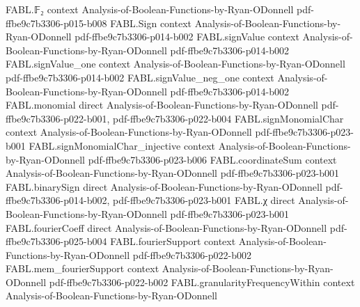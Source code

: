 \begin{theorem}
\leanok
{}
\proofstep
  {FABL.𝔽₂}
  {context}
  {Analysis-of-Boolean-Functions-by-Ryan-ODonnell}
  {pdf-ffbe9c7b3306-p015-b008}
\proofstep
  {FABL.Sign}
  {context}
  {Analysis-of-Boolean-Functions-by-Ryan-ODonnell}
  {pdf-ffbe9c7b3306-p014-b002}
\proofstep
  {FABL.signValue}
  {context}
  {Analysis-of-Boolean-Functions-by-Ryan-ODonnell}
  {pdf-ffbe9c7b3306-p014-b002}
\proofstep
  {FABL.signValue_one}
  {context}
  {Analysis-of-Boolean-Functions-by-Ryan-ODonnell}
  {pdf-ffbe9c7b3306-p014-b002}
\proofstep
  {FABL.signValue_neg_one}
  {context}
  {Analysis-of-Boolean-Functions-by-Ryan-ODonnell}
  {pdf-ffbe9c7b3306-p014-b002}
\proofstep
  {FABL.monomial}
  {direct}
  {Analysis-of-Boolean-Functions-by-Ryan-ODonnell}
  {pdf-ffbe9c7b3306-p022-b001,
    pdf-ffbe9c7b3306-p022-b004}
\proofstep
  {FABL.signMonomialChar}
  {context}
  {Analysis-of-Boolean-Functions-by-Ryan-ODonnell}
  {pdf-ffbe9c7b3306-p023-b001}
\proofstep
  {FABL.signMonomialChar_injective}
  {context}
  {Analysis-of-Boolean-Functions-by-Ryan-ODonnell}
  {pdf-ffbe9c7b3306-p023-b006}
\proofstep
  {FABL.coordinateSum}
  {context}
  {Analysis-of-Boolean-Functions-by-Ryan-ODonnell}
  {pdf-ffbe9c7b3306-p023-b001}
\proofstep
  {FABL.binarySign}
  {direct}
  {Analysis-of-Boolean-Functions-by-Ryan-ODonnell}
  {pdf-ffbe9c7b3306-p014-b002,
    pdf-ffbe9c7b3306-p023-b001}
\proofstep
  {FABL.χ}
  {direct}
  {Analysis-of-Boolean-Functions-by-Ryan-ODonnell}
  {pdf-ffbe9c7b3306-p023-b001}
\proofstep
  {FABL.fourierCoeff}
  {direct}
  {Analysis-of-Boolean-Functions-by-Ryan-ODonnell}
  {pdf-ffbe9c7b3306-p025-b004}
\proofstep
  {FABL.fourierSupport}
  {context}
  {Analysis-of-Boolean-Functions-by-Ryan-ODonnell}
  {pdf-ffbe9c7b3306-p022-b002}
\proofstep
  {FABL.mem_fourierSupport}
  {context}
  {Analysis-of-Boolean-Functions-by-Ryan-ODonnell}
  {pdf-ffbe9c7b3306-p022-b002}
\proofstep
  {FABL.granularityFrequencyWithin}
  {context}
  {Analysis-of-Boolean-Functions-by-Ryan-ODonnell}

\end{theorem}
